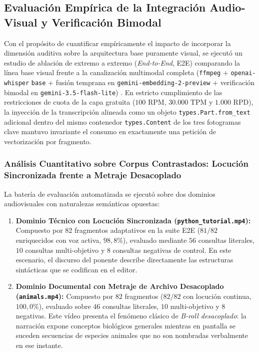 
\subsection{Evaluación Empírica de la Integración Audio-Visual y Verificación Bimodal}
\label{subsec:evaluacion_empirica_audio_visual}

Con el propósito de cuantificar empíricamente el impacto de incorporar la dimensión auditiva sobre la arquitectura base puramente visual, se ejecutó un estudio de ablación de extremo a extremo (\textit{End-to-End}, E2E) comparando la línea base visual frente a la canalización multimodal completa (\texttt{ffmpeg} + \texttt{openai-whisper} \texttt{base} + fusión temprana en \texttt{gemini-embedding-2-preview} + verificación bimodal en \texttt{gemini-3.5-flash-lite}) \cite{gemini_emb2_docs, video_rac2025}. %
En estricto cumplimiento de las restricciones de cuota de la capa gratuita ($100\text{ RPM}$, $30.000\text{ TPM}$ y $1.000\text{ RPD}$), la inyección de la transcripción alineada como un objeto \texttt{types.Part.from\_text} adicional dentro del mismo contenedor \texttt{types.Content} de los tres fotogramas clave mantuvo invariante el consumo en exactamente una petición de vectorización por fragmento. %

\subsubsection{Análisis Cuantitativo sobre Corpus Contrastados: Locución Sincronizada frente a Metraje Desacoplado}
\label{subsubsec:ablacion_cuantitativa_e2e}

La batería de evaluación automatizada se ejecutó sobre dos dominios audiovisuales con naturalezas semánticas opuestas: %
\begin{enumerate}
    \item \textbf{Dominio Técnico con Locución Sincronizada (\texttt{python\_tutorial.mp4}):} Compuesto por $82$ fragmentos adaptativos en la suite E2E ($81/82$ enriquecidos con voz activa, $98,8\%$), evaluado mediante $56$ consultas literales, $10$ consultas multi-objetivo y $8$ consultas negativas de control. %
    En este escenario, el discurso del ponente describe directamente las estructuras sintácticas que se codifican en el editor. %
    \item \textbf{Dominio Documental con Metraje de Archivo Desacoplado (\texttt{animals.mp4}):} Compuesto por $82$ fragmentos ($82/82$ con locución continua, $100,0\%$), evaluado sobre $46$ consultas literales, $10$ multi-objetivo y $8$ negativas. %
    Este vídeo presenta el fenómeno clásico de \textit{B-roll desacoplado}: la narración expone conceptos biológicos generales mientras en pantalla se suceden secuencias de especies animales que no son nombradas verbalmente en ese instante. %
\end{enumerate}

